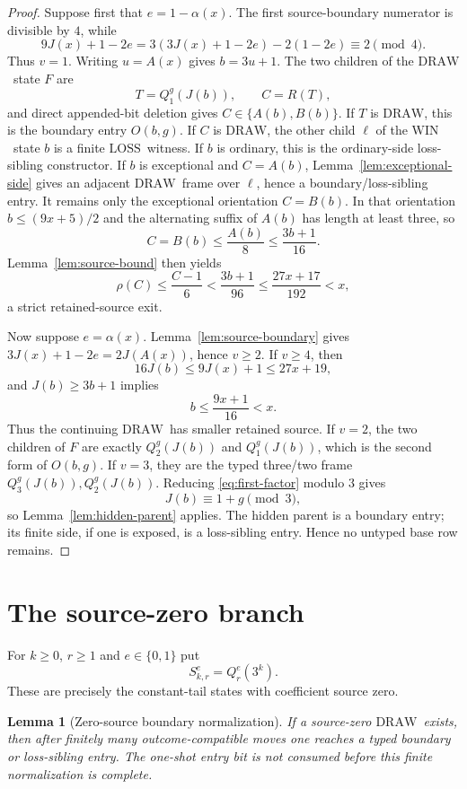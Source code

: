 \documentclass[11pt]{article}
\newtheorem{lemma}[theorem]{Lemma}
\newcommand{\WIN}{\ensuremath{\mathrm{WIN}}}
\newcommand{\LOSS}{\ensuremath{\mathrm{LOSS}}}
\newcommand{\DRAW}{\ensuremath{\mathrm{DRAW}}}
\begin{document}
\begin{proof}
Suppose first that $e=1-\alpha(x)$. The first source-boundary numerator is
divisible by $4$, while
\[
9J(x)+1-2e=3(3J(x)+1-2e)-2(1-2e)\equiv2\pmod4.
\]
Thus $v=1$. Writing $u=A(x)$ gives $b=3u+1$. The two children of the \DRAW\
state $F$ are
\[
  T=Q_1^g(J(b)),\qquad C=R(T),
\]
and direct appended-bit deletion gives
$C\in\{A(b),B(b)\}$. If $T$ is \DRAW, this is the boundary entry
$O(b,g)$. If $C$ is \DRAW, the other child $\ell$ of the \WIN\ state $b$ is a
finite \LOSS\ witness. If $b$ is ordinary, this is the ordinary-side
loss-sibling constructor. If $b$ is exceptional and $C=A(b)$,
Lemma~\ref{lem:exceptional-side} gives an adjacent \DRAW\ frame over
$\ell$, hence a boundary/loss-sibling entry. It remains only the exceptional
orientation $C=B(b)$. In that orientation
$b\le(9x+5)/2$ and the alternating suffix of $A(b)$ has length at least three,
so
\[
 C=B(b)\le\frac{A(b)}8\le\frac{3b+1}{16}.
\]
Lemma~\ref{lem:source-bound} then yields
\[
 \rho(C)\le\frac{C-1}{6}<\frac{3b+1}{96}
 \le\frac{27x+17}{192}<x,
\]
a strict retained-source exit.

Now suppose $e=\alpha(x)$. Lemma~\ref{lem:source-boundary} gives
$3J(x)+1-2e=2J(A(x))$, hence $v\ge2$. If $v\ge4$, then
\[
16J(b)\le9J(x)+1\le27x+19,
\]
and $J(b)\ge3b+1$ implies
\[
  b\le\frac{9x+1}{16}<x.
\]
Thus the continuing \DRAW\ has smaller retained source. If $v=2$, the two
children of $F$ are exactly $Q_2^g(J(b))$ and $Q_1^g(J(b))$, which is the
second form of $O(b,g)$. If $v=3$, they are the typed three/two frame
$Q_3^g(J(b)),Q_2^g(J(b))$. Reducing
\eqref{eq:first-factor} modulo $3$ gives
\[
  J(b)\equiv1+g\pmod3,
\]
so Lemma~\ref{lem:hidden-parent} applies. The hidden parent is a boundary
entry; its finite side, if one is exposed, is a loss-sibling entry. Hence no
untyped base row remains.
\end{proof}

\section{The source-zero branch}

For $k\ge0$, $r\ge1$ and $e\in\{0,1\}$ put
\[
  S_{k,r}^e=Q_r^e(3^k).
\]
These are precisely the constant-tail states with coefficient source zero.

\begin{lemma}[Zero-source boundary normalization]\label{lem:zero-source}
If a source-zero \DRAW\ exists, then after finitely many outcome-compatible
moves one reaches a typed boundary or loss-sibling entry. The one-shot entry
bit is not consumed before this finite normalization is complete.
\end{lemma}
\end{document}
